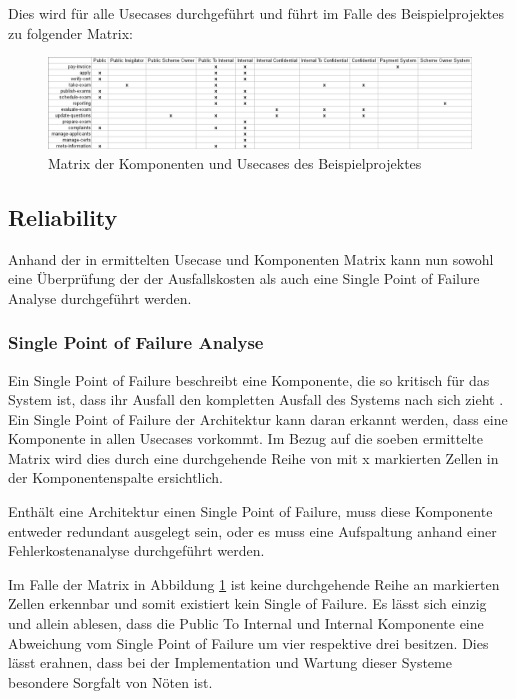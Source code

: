 \hfill \break

Dies wird für alle Usecases durchgeführt und führt im Falle des Beispielprojektes zu folgender Matrix:

\begin{figure}[H]
    \centering
    \includegraphics[scale=0.4]{img/matrix.png}
    \caption{Matrix der Komponenten und Usecases des Beispielprojektes}
    \label{fig:matrix}
\end{figure}




\subsection{Reliability}
Anhand der in ermittelten Usecase und Komponenten Matrix kann nun sowohl eine Überprüfung der der Ausfallskosten als auch eine Single Point of Failure Analyse durchgeführt werden.

\subsubsection{Single Point of Failure Analyse}

Ein Single Point of Failure beschreibt eine Komponente, die so kritisch für das System ist, dass ihr Ausfall den kompletten Ausfall des Systems nach sich zieht \cite[S. 3]{single}. Ein Single Point of Failure der Architektur kann daran erkannt werden, dass eine Komponente in allen Usecases vorkommt. Im Bezug auf die soeben ermittelte Matrix wird dies durch eine durchgehende Reihe von mit x markierten Zellen in der Komponentenspalte ersichtlich.

Enthält eine Architektur einen Single Point of Failure, muss diese Komponente entweder redundant ausgelegt sein, oder es muss eine Aufspaltung anhand einer Fehlerkostenanalyse durchgeführt werden.

Im Falle der Matrix in Abbildung \ref{fig:matrix} ist keine durchgehende Reihe an markierten Zellen erkennbar und somit existiert kein Single of Failure. Es lässt sich einzig und allein ablesen, dass die Public To Internal und Internal Komponente eine Abweichung vom Single Point of Failure um vier respektive drei besitzen. Dies lässt erahnen, dass bei der Implementation und Wartung dieser Systeme besondere Sorgfalt von Nöten ist.

